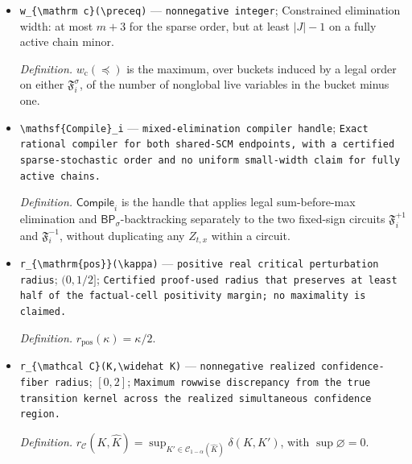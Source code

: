 \documentclass{article}
\begin{document}
\begin{itemize}
  \par\smallskip\noindent\emph{Definition.} After singleton substitution, \(m\) is the number of remaining non-singleton posterior-row selectors specified by \(\texttt{def:active-ambiguity-count}\).
  \item \texttt{w\_\allowbreak{}\{\textbackslash{}\allowbreak{}mathrm c\}\allowbreak{}(\textbackslash{}\allowbreak{}preceq)} --- \texttt{nonnegative integer}; Constrained elimination width: at most \(m+3\) for the sparse order, but at least \(|J|-1\) on a fully active chain minor.
  \par\smallskip\noindent\emph{Definition.} \(w_{\mathrm c}(\preceq)\) is the maximum, over buckets induced by a legal order on either \(\mathfrak F_i^{\sigma}\), of the number of nonglobal live variables in the bucket minus one.
  \item \texttt{\textbackslash{}\allowbreak{}mathsf\{Compile\}\allowbreak{}\_\allowbreak{}i} --- \texttt{mixed-\allowbreak{}elimination compiler handle}; \texttt{Exact rational compiler for both shared-\allowbreak{}SCM endpoints,\allowbreak{} with a certified sparse-\allowbreak{}stochastic order and no uniform small-\allowbreak{}width claim for fully active chains.}
  \par\smallskip\noindent\emph{Definition.} \(\mathsf{Compile}_i\) is the handle that applies legal sum-before-max elimination and \(\mathsf{BP}_{\sigma}\)-backtracking separately to the two fixed-sign circuits \(\mathfrak F_i^{+1}\) and \(\mathfrak F_i^{-1}\), without duplicating any \(Z_{t,x}\) within a circuit.
  \item \texttt{r\_\allowbreak{}\{\textbackslash{}\allowbreak{}mathrm\{pos\}\allowbreak{}\}\allowbreak{}(\textbackslash{}\allowbreak{}kappa)} --- \texttt{positive real critical perturbation radius}; \((0,1/2]\); \texttt{Certified proof-\allowbreak{}used radius that preserves at least half of the factual-\allowbreak{}cell positivity margin;\allowbreak{} no maximality is claimed.}
  \par\smallskip\noindent\emph{Definition.} \(r_{\mathrm{pos}}(\kappa)=\kappa/2\).
  \item \texttt{r\_\allowbreak{}\{\textbackslash{}\allowbreak{}mathcal C\}\allowbreak{}(K,\allowbreak{}\textbackslash{}\allowbreak{}widehat K)} --- \texttt{nonnegative realized confidence-\allowbreak{}fiber radius}; \([0,2]\); \texttt{Maximum rowwise discrepancy from the true transition kernel across the realized simultaneous confidence region.}
  \par\smallskip\noindent\emph{Definition.} \(r_{\mathcal C}(K,\widehat K)=\sup_{K'\in\mathcal C_{1-\alpha}(\widehat K)}\delta(K,K')\), with \(\sup\varnothing=0\).
\end{itemize}
\end{document}
